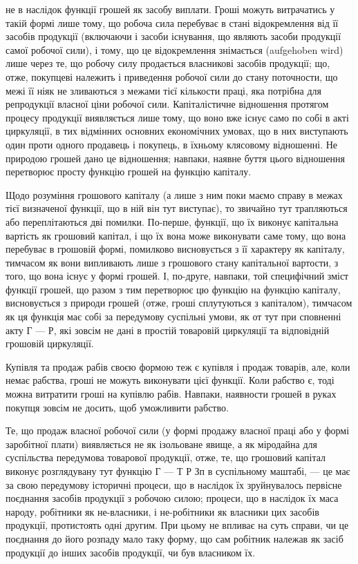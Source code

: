 \parcont{}  %
не в наслідок функції грошей як засобу виплати. Гроші можуть витрачатись
у такій формі лише тому, що робоча сила перебуває в стані відокремлення
від її засобів продукції (включаючи і засоби існування, що являють
засоби продукції самої робочої сили), і тому, що це відокремлення
знімається (aufgehoben wird) лише через те, що робочу силу продається
власникові засобів продукції; що, отже, покупцеві належить і приведення
робочої сили до стану поточности, що межі її ніяк не зливаються з
межами тієї кількости праці, яка потрібна для репродукції власної ціни
робочої сили. Капіталістичне відношення протягом процесу продукції
виявляється лише тому, що воно вже існує само по собі
в акті циркуляції, в тих відмінних основних економічних умовах, що в
них виступають один проти одного продавець і покупець, в їхньому клясовому
відношенні. Не природою грошей дано це відношення; навпаки,
наявне буття цього відношення перетворює просту функцію грошей на
функцію капіталу.

Щодо розуміння грошового капіталу (а лише з ним поки маємо
справу в межах тієї визначеної функції, що в ній він тут виступає), то
звичайно тут трапляються або переплітаються дві помилки. По-перше,
функції, що їх виконує капітальна вартість як грошовий капітал, і що
їх вона може виконувати саме тому, що вона перебуває в грошовій
формі, помилково висновується з її характеру як капіталу, тимчасом як
вони випливають лише з грошового стану капітальної вартости, з того,
що вона існує у формі грошей. І, по-друге, навпаки, той специфічний
зміст функції грошей, що разом з тим перетворює цю функцію на функцію
капіталу, висновується з природи грошей (отже, гроші сплутуються
з капіталом), тимчасом як ця функція має собі за передумову
суспільні умови, як от тут при сповненні акту Г — Р, які зовсім не
дані в простій товаровій циркуляції та відповідній грошовій циркуляції.

Купівля та продаж рабів своєю формою теж є купівля і продаж
товарів, але, коли немає рабства, гроші не можуть виконувати
цієї функції. Коли рабство є, тоді можна витратити гроші на
купівлю рабів. Навпаки, наявности грошей в руках покупця зовсім не
досить, щоб уможливити рабство.

Те, що продаж власної робочої сили (у формі продажу власної праці
або у формі заробітної плати) виявляється не як ізольоване явище,
а як міродайна для суспільства передумова товарової продукції, отже,
те, що грошовий капітал виконує розглядувану тут функцію Г — Т Р Зп
в суспільному маштабі, — це має за свою передумову історичні процеси,
що в наслідок їх зруйнувалось первісне поєднання засобів продукції з
робочою силою; процеси, що в наслідок їх маса народу, робітники як
не-власники, і не-робітники як власники цих засобів продукції, протистоять
одні другим. При цьому не впливає на суть справи, чи це поєднання
до його розпаду мало таку форму, що сам робітник належав як засіб
продукції до інших засобів продукції, чи був власником їх.
